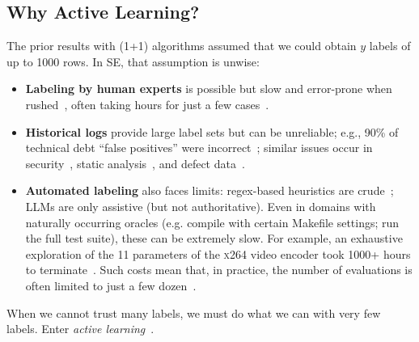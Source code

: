 \documentclass[AMA,STIX2COL]{WileyNJDv5}
\begin{document}
\subsection{Why Active Learning?}
The prior results with (1+1) algorithms
assumed  that  we could  obtain   $y$ labels of up to 1000 rows.  
In SE, that assumption is unwise:
\begin{itemize}
\item
{\bf Labeling by human experts}  is possible but slow and error-prone when rushed~\cite{easterby1980design}, often taking hours for just a few cases~\cite{KingtonAlison2009,lustosa2024learning,valerdi2010heuristics}.
\item
{\bf Historical logs} provide large label sets but can be unreliable; e.g., 90\% of technical debt ``false positives'' were incorrect~\cite{yu2020identifying}; similar issues occur in security~\cite{wu2021data}, static analysis~\cite{kang2022detecting}, and defect data~\cite{shepperd2013data}.
\item
{\bf Automated labeling} also faces limits: regex-based heuristics are crude~\cite{kamei2012large}; LLMs are only assistive (but not authoritative).
Even in domains with naturally occurring oracles (e.g. compile with certain Makefile settings; run the full test suite), these can be extremely slow. For example, an exhaustive
exploration of the 11 parameters of the \textsc{x264} video encoder took 1000+  hours to terminate~\cite{DBLP:conf/wosp/ValovPGFC17}. Such costs mean that, in practice, the number of evaluations is often limited to just a few dozen~\cite{DBLP:journals/tse/Nair0MSA20,DBLP:conf/icse/0003XC021}.
\end{itemize}
 When we cannot trust many labels, we must do what we can with very few labels. Enter {\em active learning}~\cite{settles2008analysis}. 
 
\end{document}
